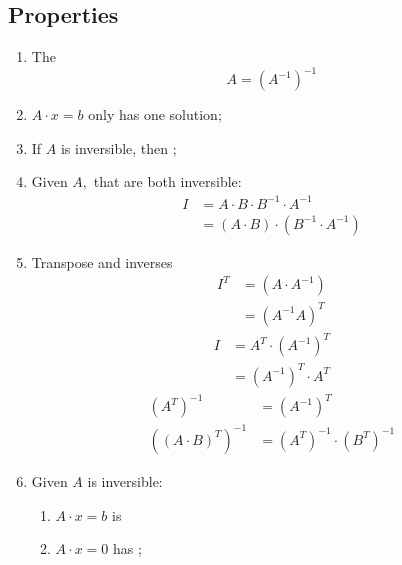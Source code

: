 \subsection{Properties}
  
  \begin{enumerate}
    \item The 
    \begin{displaymath}
      A = \left( A^{-1} \right)^{-1}
    \end{displaymath}
    
    \item $ A \cdot x = b $ only has one solution;
    
    \item If $ A $ is inversible, then ;
    \item Given $ A, $ that are both inversible:
    \begin{align*}
      I &= A \cdot B \cdot B^{-1} \cdot A^{-1} \\ 
      &= \left( A \cdot B \right) \cdot \left( B^{-1} \cdot A^{-1} \right)
    \end{align*}
    
    \item Transpose and inverses 
    \begin{align*}
      I^{T} &= \left( A \cdot A^{-1} \right) \\ 
      &= \left( A^{-1} A \right)^{T}
    \end{align*}
    \begin{align*}
      I &= A^{T} \cdot \left( A^{-1} \right)^{T} \\ 
      &= \left( A^{-1} \right)^{T} \cdot A^{T}
    \end{align*}
    \begin{align*}
      \left( A^{T} \right)^{-1} &= \left( A^{-1} \right)^{T} \\ 
      \left( \left( A \cdot B \right)^{T} \right)^{-1} &= 
      \left( A^{T} \right)^{-1} \cdot \left( B^{T} \right)^{-1}
    \end{align*}
    
    \item Given $ A $ is inversible:
    \begin{enumerate}
      \item $ A \cdot x = b $ is 
      
      \item $ A \cdot x = 0 $ has ;
      

\end{enumerate}
\end{enumerate}
